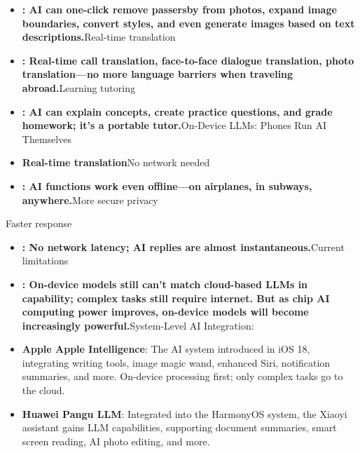 
\begin{itemize}
  \item \textbf{: AI can one-click remove passersby from photos, expand image boundaries, convert styles, and even generate images based on text descriptions.}Real-time translation
  \item \textbf{: Real-time call translation, face-to-face dialogue translation, photo translation—no more language barriers when traveling abroad.}Learning tutoring
  \item \textbf{: AI can explain concepts, create practice questions, and grade homework; it's a portable tutor.}On-Device LLMs: Phones Run AI Themselves
  \item \textbf{Real-time translation}No network needed
  \item \textbf{: AI functions work even offline—on airplanes, in subways, anywhere.}More secure privacy
\end{itemize}


Faster response

\begin{itemize}
  \item \textbf{: No network latency; AI replies are almost instantaneous.}Current limitations
  \item \textbf{: On-device models still can't match cloud-based LLMs in capability; complex tasks still require internet. But as chip AI computing power improves, on-device models will become increasingly powerful.}System-Level AI Integration:
  \item \textbf{Apple Apple Intelligence}: The AI system introduced in iOS 18, integrating writing tools, image magic wand, enhanced Siri, notification summaries, and more. On-device processing first; only complex tasks go to the cloud.
  \item \textbf{Huawei Pangu LLM}: Integrated into the HarmonyOS system, the Xiaoyi assistant gains LLM capabilities, supporting document summaries, smart screen reading, AI photo editing, and more.
\end{itemize}


